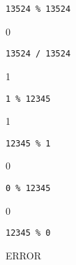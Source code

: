 \nextq
\verb!13524 % 13524!
\\
\ANSWER
\begin{answercode}
0
\end{answercode}

\nextq
\verb!13524 / 13524!
\\
\ANSWER
\begin{answercode}
1
\end{answercode}

\nextq
\verb!1 % 12345!
\\
\ANSWER
\begin{answercode}
1
\end{answercode}

\nextq
\verb!12345 % 1!
\\
\ANSWER
\begin{answercode}
0
\end{answercode}

\nextq
\verb!0 % 12345!
\\
\ANSWER
\begin{answercode}
0
\end{answercode}

\nextq
\verb!12345 % 0!
\\
\ANSWER
\begin{answercode}
ERROR
\end{answercode}


